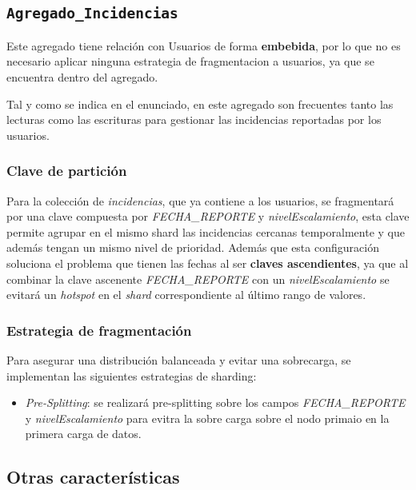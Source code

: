 \documentclass[]{article}
\begin{document}
\subsection{\texttt{Agregado\_Incidencias}}
\label{subsec:incidencias}
Este agregado tiene relación con Usuarios de forma \textbf{embebida}, por lo que no es necesario aplicar ninguna estrategia de fragmentacion a usuarios, ya que se encuentra dentro del agregado.

Tal y como se indica en el enunciado, en este agregado son frecuentes tanto las lecturas como las escrituras para gestionar las incidencias reportadas por los usuarios.
\subsubsection{Clave de partición}
\label{subsubsec:particion_incidencias}
Para la colección de \textit{incidencias}, que ya contiene a los usuarios, se fragmentará por una clave compuesta por \textit{FECHA\_REPORTE} y \textit{nivelEscalamiento}, esta clave permite agrupar en el mismo shard las incidencias cercanas temporalmente y que además tengan un mismo nivel de prioridad. Además que esta configuración soluciona el problema que tienen las fechas al ser \textbf{claves ascendientes}, ya que al combinar la clave ascenente \textit{FECHA\_REPORTE} con un \textit{nivelEscalamiento} se evitará un \textit{hotspot} en el \textit{shard} correspondiente al último rango de valores. 

\subsubsection{Estrategia de fragmentación}
\label{subsubsec:fragmentacion_incidencias}

Para asegurar una distribución balanceada y evitar una sobrecarga, se implementan las siguientes estrategias de sharding:
\begin{itemize}
    \item \textit{Pre-Splitting}: se realizará pre-splitting sobre los campos \textit{FECHA\_REPORTE} y \textit{nivelEscalamiento} para evitra la sobre carga sobre el nodo primaio en la primera carga de datos.
\end{itemize}

\subsection{Otras características}
\label{subsec:others}
\end{document}
